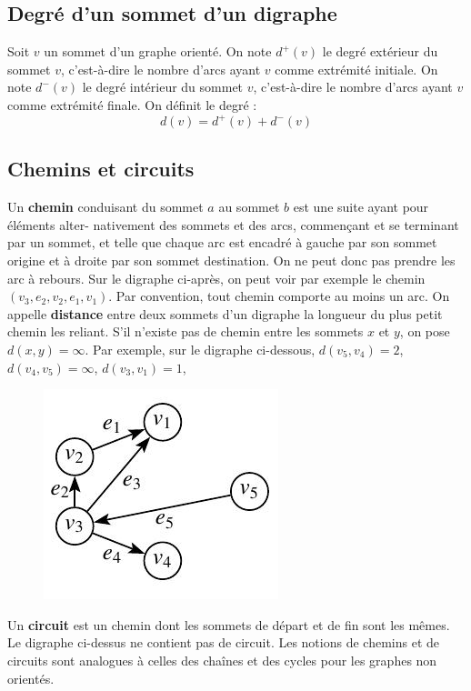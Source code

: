 \subsection{Degré d’un sommet d’un digraphe}
Soit $ v $ un sommet d'un graphe orienté.
On note $ d^{+} (v) $ le degré extérieur du sommet $ v $, c'est-à-dire le nombre d'arcs ayant $ v $
comme extrémité initiale.
On note $ d^{-} (v) $ le degré intérieur du sommet $ v $, c'est-à-dire le nombre d'arcs ayant $ v $
comme extrémité finale.
On définit le degré :
$$ d(v) = d^{ +} (v) + d^{-}(v) $$

\subsection{Chemins et circuits}
Un \textbf{chemin} conduisant du sommet $ a $ au sommet $ b $ est une suite ayant pour éléments alter-
nativement des sommets et des arcs, commençant et se terminant par un sommet, et telle
que chaque arc est encadré à gauche par son sommet origine et à droite par son sommet
destination. On ne peut donc pas prendre les arc à rebours. Sur le digraphe ci-après, on
peut voir par exemple le chemin $ (v_{3}, e_{2 }, v_{2} , e_{1} , v_{1}) $. Par convention, tout chemin comporte
au moins un arc.
On appelle  \textbf{distance}  entre deux sommets d'un digraphe la longueur du plus petit chemin
les reliant. S'il n'existe pas de chemin entre les sommets $ x $ et $ y $, on pose $ d(x, y) = \infty $.
Par exemple, sur le digraphe ci-dessous, $ d(v_{5} , v_{4}) = 2 $, $ d(v_{4}, v_{5}) = \infty $, $ d(v_{3} , v_{1} ) = 1 $,

\begin{figure}[h]
\centering
\includegraphics[width=0.4\linewidth]{images/graph22}
\end{figure}

Un \textbf{circuit} est un chemin dont les sommets de départ et de fin sont les mêmes. Le digraphe
ci-dessus ne contient pas de circuit.
Les notions de chemins et de circuits sont analogues à celles des chaînes et des cycles pour
les graphes non orientés.

